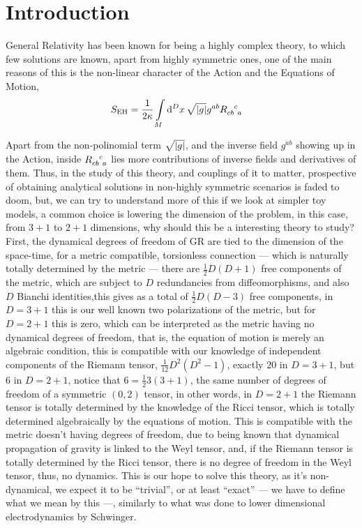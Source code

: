 \section{Introduction}

General Relativity has been known for being a highly complex theory, to which few solutions are known, apart from highly symmetric ones, one of 
the main reasons of this is the non-linear character of the Action and the Equations of Motion,
\begin{align*}
    S_{\textnormal{EH}}&=\frac{1}{2\kappa}\int\limits_M\dd[D]{x}\sqrt{\abs{g}}g^{ab}\tensor{R}{_c_b^c_a}
\end{align*}

Apart from the non-polinomial term $\sqrt{\abs{g}}$, and the inverse field $g^{ab}$ showing up in the Action, inside $\tensor{R}{_c_b^c_a}$ lies more 
contributions of inverse fields and derivatives of them. Thus, in the study of this theory, and couplings of it to matter, prospective of obtaining 
analytical solutions in non-highly symmetric scenarios is faded to doom, but, we can try to understand more of this if we look at simpler toy models, 
a common choice is lowering the dimension of the problem, in this case, from $3+1$ to $2+1$ dimensions, why should this be a interesting theory to study? First, 
the dynamical degrees of freedom of GR are tied to the dimension of the space-time, for a metric compatible, torsionless connection --- which is 
naturally totally determined by the metric --- there are $\frac12D(D+1)$ free components of the metric, which are subject to $D$ redundancies from diffeomorphisms, 
and also $D$ Bianchi identities,this gives as a total of $\frac12 D(D-3)$ free components, in $D=3+1$ this is our well known two polarizations of the 
metric, but for $D=2+1$ this is zero, which can be interpreted as the metric having no dynamical degrees of freedom, that is, the equation of motion 
is merely an algebraic condition, this is compatible with our knowledge of independent components of the Riemann tensor, $\frac{1}{12}D^2(D^2-1)$, exactly $20$ 
in $D=3+1$, but $6$ in $D=2+1$, notice that $6=\frac123(3+1)$, the same number of degrees of freedom of a symmetric $(0,2)$ tensor, in other words, 
in $D=2+1$ the Riemann tensor is totally determined by the knowledge of the Ricci tensor, which is totally determined algebraically by the equations of motion. 
This is compatible with the metric doesn't having degrees 
of freedom, due to being known that dynamical propagation of gravity is linked to the Weyl tensor, and, if the Riemann tensor is totally determined by the 
Ricci tensor, there is no degree of freedom in the Weyl tensor, thus, no dynamics.
This is our hope to solve this theory, as it's non-dynamical, we expect it to be ``trivial'', or at least ``exact'' --- we have to define what we mean by this ---, 
similarly to what was done to lower dimensional electrodynamics by Schwinger.

